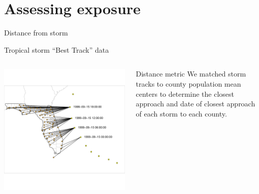 \documentclass[ignorenonframetext,]{beamer}
\begin{document}
\section{Assessing exposure}\label{assessing-exposure-3}

\begin{frame}{Distance from storm}

\large Tropical storm ``Best Track'' data \vspace{-0.7cm}

\begin{columns}
\begin{column}{0.7\textwidth}

\includegraphics[width=\textwidth]{finding_closest_point} 
\end{column}
\begin{column}{0.3\textwidth}
\small
\begin{block}{Distance metric}
We matched storm tracks to county population mean centers to determine the closest approach and date of closest approach of each storm to each county.
\end{block}
\end{column}
\end{columns}

\end{frame}
\end{document}
